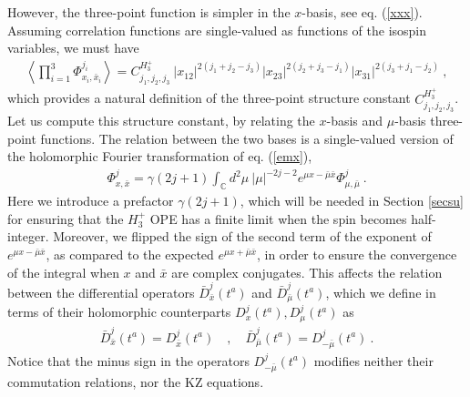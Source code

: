 \documentclass[12pt,a4paper,notitlepage]{report}
\newcommand \la {\left\langle}
\newcommand \ra {\right\rangle}
\newcommand \C {\mathbb{C}}
\numberwithin{equation}{section}
\theoremstyle{break}
\begin{document}
However, the three-point function is simpler in the $x$-basis, see eq. (\ref{xxx}). Assuming correlation functions are single-valued as functions of the isospin variables, we must have
\begin{align}
  \la \prod_{i=1}^3 \Phi^{j_i}_{x_i,\bar{x}_i} \ra = C^{H_3^+}_{j_1,j_2,j_3}\ |x_{12}|^{2(j_1+j_2-j_3)} |x_{23}|^{2(j_2+j_3-j_1)} |x_{31}|^{2(j_3+j_1-j_2)}\ ,
\label{ch}
\end{align}
which provides a natural definition of the three-point structure constant $C^{H_3^+}_{j_1,j_2,j_3}$. Let us compute this structure constant, by relating the $x$-basis and $\mu$-basis three-point functions. The relation between the two bases is a single-valued version of the holomorphic Fourier transformation of eq. (\ref{emx}), 
\begin{align}
 \Phi^j_{x,\bar{x}} = \gamma(2j+1)\int_{\C} d^2\mu\ |\mu|^{-2j-2} e^{\mu x -\bar{\mu}\bar{x}}\Phi^j_{\mu,\bar{\mu}}\ .
\end{align}
Here we introduce a prefactor $\gamma(2j+1)$, which will be needed in Section \ref{secsu} for ensuring that the $H_3^+$ OPE has a finite limit when the spin becomes half-integer.
Moreover, we flipped the sign of the second term of the exponent of $e^{\mu x -\bar{\mu}\bar{x}}$, as compared to the expected $e^{\mu x +\bar{\mu}\bar{x}}$, in order to ensure the convergence of the integral when $x$ and $\bar{x}$ are complex conjugates. This affects the relation between the differential operators $\bar{D}^j_{\bar{x}}(t^a)$ and $\bar{D}^j_{\bar{\mu}}(t^a)$, which we define in terms of their holomorphic counterparts $D^j_x(t^a), D^j_\mu(t^a)$ as 
\begin{align}
 \bar{D}^j_{\bar{x}}(t^a) = D^j_{\bar{x}}(t^a)  \quad , \quad \bar{D}^j_{\bar{\mu}}(t^a) = D^j_{-\bar{\mu}}(t^a)\ . 
\end{align}
Notice that the minus sign in the operators $D^j_{-\bar{\mu}}(t^a)$ modifies neither their commutation relations, nor the KZ equations.
\end{document}
